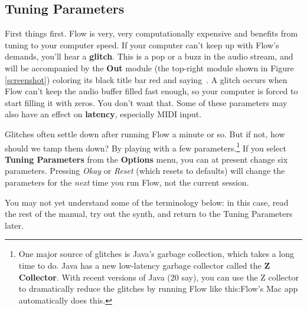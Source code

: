 \documentclass{article}
\newcommand\name{Flow}
\begin{document}
\subsection{Tuning Parameters}
First things first.  {\name} is very, very computationally expensive and benefits from tuning to your computer speed.  If your computer can't keep up with Flow's demands, you'll hear a {\bf glitch}.  This is a pop or a buzz in the audio stream, and will be accompanied by the {\bf Out} module (the top-right module shown in Figure \ref{screenshot}) coloring its black title bar red and saying \,.  A glitch occurs when Flow can't keep the audio buffer filled fast enough, so your computer is forced to start filling it with zeros.  You don't want that.  Some of these parameters may also have an effect on {\bf latency}, especially MIDI input.

Glitches often settle down after running Flow a minute or so.  But if not, how should we tamp them down?  By playing with a few parameters.\footnote{One major source of glitches is Java's garbage collection, which takes a long time to do.  Java has a new low-latency garbage collector called the {\bf Z Collector}.  With recent versions of Java (20 say), you can use the Z collector to dramatically reduce the glitches by running Flow like this:\quad Flow's Mac app automatically does this.}  If you select {\bf Tuning Parameters} from the {\bf Options} menu, you can at present change six parameters.  Pressing {\it Okay} or {\it Reset} (which resets to defaults) will change the parameters for the {\it next} time you run {\name}, not the current session.   

You may not yet understand some of the terminology below: in this case, read the rest of the manual, try out the synth, and return to the Tuning Parameters later.
\end{document}
